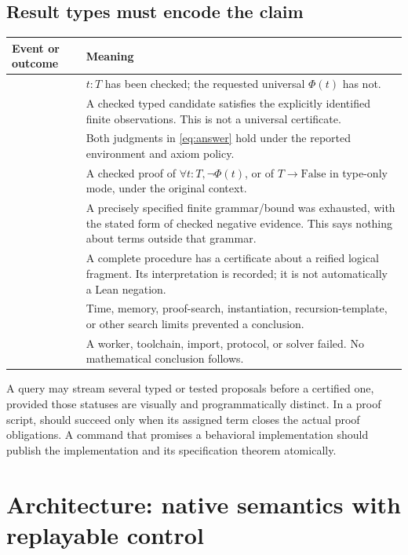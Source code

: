 \subsection{Result types must encode the claim}
\begin{longtable}{@{}L{0.23\textwidth}L{0.69\textwidth}@{}}
\toprule
Event or outcome & Meaning \\
\midrule
\endhead
{} & $t:T$ has been checked; the requested universal $\Phi(t)$ has not. \\
 & A checked typed candidate satisfies the explicitly identified finite observations. This is not a universal certificate. \\
 & Both judgments in \eqref{eq:answer} hold under the reported environment and axiom policy. \\
 & A checked proof of $\forall t:T,\neg\Phi(t)$, or of $T\to\mathrm{False}$ in type-only mode, under the original context. \\
 & A precisely specified finite grammar/bound was exhausted, with the stated form of checked negative evidence. This says nothing about terms outside that grammar. \\
 & A complete procedure has a certificate about a reified logical fragment. Its interpretation is recorded; it is not automatically a Lean negation. \\
 & Time, memory, proof-search, instantiation, recursion-template, or other search limits prevented a conclusion. \\
 & A worker, toolchain, import, protocol, or solver failed. No mathematical conclusion follows. \\
\bottomrule
\end{longtable}
A query may stream several typed or tested proposals before a certified one, provided those statuses are visually and programmatically distinct. In a proof script,  should succeed only when its assigned term closes the actual proof obligations. A command that promises a behavioral implementation should publish the implementation and its specification theorem atomically.

\section{Architecture: native semantics with replayable control}
\label{sec:architecture}
